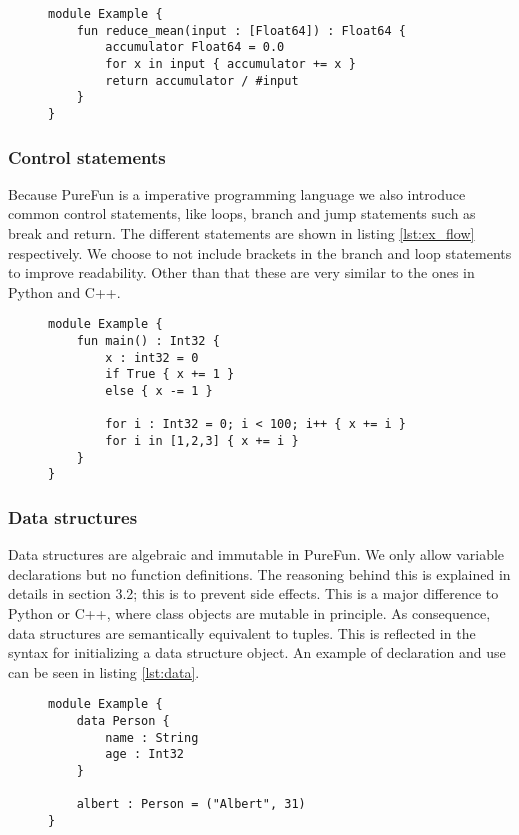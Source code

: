 \begin{figure}
	\begin{lstlisting}[caption={A simple example calculating the mean for a sequence of double precision floating point values in PureFun.}, label={lst:simple_ex}]
module Example {
	fun reduce_mean(input : [Float64]) : Float64 {
		accumulator Float64 = 0.0
		for x in input { accumulator += x }
		return accumulator / #input
	}
}
	\end{lstlisting}
\end{figure} 

\subsubsection{Control statements} Because PureFun is a imperative programming language we also introduce common control statements, like loops, branch and jump statements such as break and return. The different statements are shown in listing \ref{lst:ex_flow} respectively. We choose to not include brackets in the branch and loop statements to improve readability. Other than that these are very similar to the ones in Python and C++.

\begin{figure}
	\begin{lstlisting}[caption={Some examples of control statements in PureFun}, label={lst:ex_flow}]
module Example {
	fun main() : Int32 {
		x : int32 = 0
		if True { x += 1 }
		else { x -= 1 }
		
		for i : Int32 = 0; i < 100; i++ { x += i }
		for i in [1,2,3] { x += i }
	}
}
	\end{lstlisting}
\end{figure}

\subsubsection{Data structures} Data structures are algebraic and immutable in PureFun. We only allow variable declarations but no function definitions. The reasoning behind this is explained in details in section 3.2; this is to prevent side effects. This is a major difference to Python or C++, where class objects are mutable in principle. As consequence, data structures are semantically equivalent to tuples. This is reflected in the syntax for initializing a data structure object. An example of declaration and use can be seen in listing \ref{lst:data}.

\begin{figure}
	\begin{lstlisting}[caption={Simple example of declaration and use of user defined data structures.}, label={lst:data}]
module Example {
	data Person {
		name : String
		age : Int32
	}
	
	albert : Person = ("Albert", 31)
}
	\end{lstlisting}
\end{figure}


